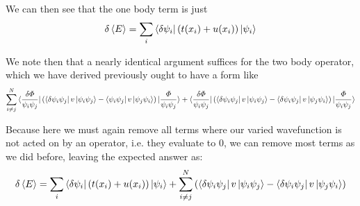 \documentclass[11pt]{article} %
\begin{document}
We can then see that the one body term is just \\
\begin{equation}
\delta \braket{E}=\sum_{i} \bra{\delta\psi_i}\left(t(x_i)+u(x_i)\right)\ket{\psi_i}
\end{equation}

We note then that a nearly identical argument suffices for the two body operator, which we have derived previously ought to have a form like\\
\begin{equation}
 \sum_{i\neq j}^N \bra{\frac{\delta \Phi}{\psi_i \psi_j }}\left( \bra{\delta \psi_i\psi_j  }v\ket{\psi_i \psi_j} -\bra{ \psi_i\psi_j}v\ket{\psi_j \psi_i }\right)  \ket{\frac{\Phi}{\psi_i \psi_j }} +\bra{\frac{\delta \Phi}{\psi_i \psi_j }}\left(   \bra{\delta \psi_i\psi_j  }v\ket{\psi_i \psi_j} -\bra{\delta \psi_i\psi_j}v\ket{\psi_j \psi_i }\right)\ket{\frac{\Phi}{ \psi_i \psi_j }} 
\end{equation}

Because here we must again remove all terms where our varied wavefunction is not acted on by an operator, i.e. they evaluate to 0,  we can remove most terms as we did before, leaving the expected answer as:\\

\begin{equation}
\delta \braket{E}=\sum_{i} \bra{\delta\psi_i}\left(t(x_i)+u(x_i)\right)\ket{\psi_i}+\sum_{i\neq j}^N\left( \bra{\delta \psi_i\psi_j}v\ket{\psi_i \psi_j} -\bra{\delta \psi_i\psi_j}v\ket{\psi_j \psi_i}  \right)
\end{equation}
	
	
\end{document}
